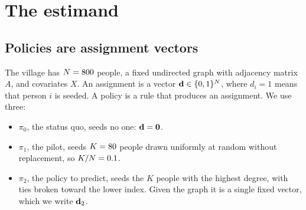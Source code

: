 \section{The estimand}\label{sec:estimand}

\subsection{Policies are assignment vectors}

The village has $N=800$ people, a fixed undirected graph with adjacency
matrix $A$, and covariates $X$. An assignment is a vector
$\mathbf{d}\in\{0,1\}^N$, where $d_i=1$ means that person $i$ is seeded. A policy is a
rule that produces an assignment. We use three:
\begin{itemize}
  \item $\pi_0$, the status quo, seeds no one: $\mathbf{d}=\mathbf{0}$.
  \item $\pi_1$, the pilot, seeds $K=80$ people drawn uniformly at random
        without replacement, so $K/N=0.1$.
  \item $\pi_2$, the policy to predict, seeds the $K$ people with the highest
        degree, with ties broken toward the lower index. Given the graph it is a
        single fixed vector, which we write $\mathbf{d}_2$.
\end{itemize}

